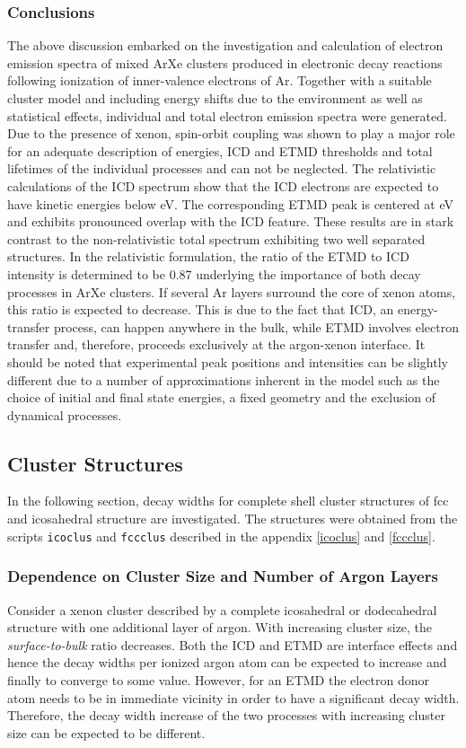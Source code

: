 \subsubsection{Conclusions}
The above discussion embarked on the investigation and calculation of electron
emission spectra of mixed ArXe clusters produced in electronic decay reactions
following ionization of inner-valence electrons of Ar.
Together with a suitable cluster model and including
energy shifts due to the environment as well as statistical effects,
individual and total electron emission spectra were generated. Due to the
presence of xenon, spin-orbit coupling was shown to play a major role for an
adequate description of energies, ICD and ETMD thresholds and total lifetimes
of the individual processes and can not be neglected. The  relativistic
calculations of the ICD spectrum show that the ICD electrons are expected to
have kinetic energies below \unit[2]{eV}. The corresponding ETMD peak is
centered at \unit[2]{eV} and exhibits pronounced overlap with the ICD feature.
These results are in stark contrast to the non-relativistic total spectrum
exhibiting two well separated structures. In the relativistic formulation,
the ratio of the ETMD to ICD intensity is determined to be 0.87 underlying the
importance of both decay processes in ArXe clusters.
If several Ar layers surround the core of xenon atoms,
this ratio is expected to decrease.
This is due to the fact that ICD, an energy-transfer process, can happen
anywhere in the bulk, while ETMD involves electron transfer and, therefore,
proceeds exclusively at the argon-xenon interface. It should be noted that
experimental peak positions and intensities can be slightly different due to
a number of approximations inherent in the model such as the choice of initial
and final state energies, a fixed geometry and
the exclusion of dynamical processes.



\subsection{Cluster Structures}
In the following section, decay widths for complete shell cluster structures
of \ac{fcc} and icosahedral structure are investigated. The structures were
obtained from the scripts \verb|icoclus| and \verb|fccclus| described in
the appendix \ref{icoclus} and \ref{fccclus}.

\subsubsection{Dependence on Cluster Size and Number of Argon Layers}
Consider a xenon cluster described by a complete icosahedral or dodecahedral
structure with one additional layer of argon. With increasing cluster size,
the \emph{surface-to-bulk} ratio decreases. Both the \ac{ICD} and \ac{ETMD}
are interface
effects and hence the decay widths per ionized argon atom can be expected
to increase and finally
to converge to some value. However, for an \ac{ETMD} the electron donor atom
needs to be in immediate vicinity in order to have a significant decay
width. Therefore, the decay width increase of the two processes with increasing
cluster size can be expected to be different.

